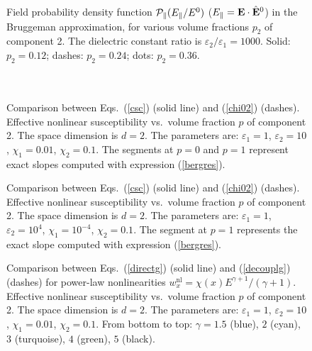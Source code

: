 \begin{figure}
\narrowtext
\vspace*{0.0cm}
\centerline{
}
\vspace*{0.0cm}
\caption{Field probability density function 
${\cal P}_\parallel(E_\parallel/E^0)$ 
($E_\parallel={\bf E}\cdot\hat{\bf E}^0$) in 
the Bruggeman approximation, for various volume 
fractions $p_2$ of component 2. The dielectric 
constant ratio is $\varepsilon_2/\varepsilon_1=1000$. 
Solid: $p_2=0.12$; dashes: $p_2=0.24$; dots: $p_2=0.36$.\\
\\
\\
}
\label{fig3}
\end{figure}

\begin{figure}
\narrowtext
\vspace*{0.0cm}
\centerline{
}
\vspace*{0.3cm}
\caption{Comparison between Eqs.\ (\ref{csc}) 
(solid line) and (\ref{chi02}) (dashes). Effective 
nonlinear susceptibility vs.\ volume fraction $p$ of 
component 2. The space dimension is $d=2$. The 
parameters are: $\varepsilon_1=1$, $\varepsilon_2=10$, 
$\chi_1=0.01$, $\chi_2=0.1$. The segments at $p=0$ and 
$p=1$ represent exact slopes computed with expression 
(\ref{bergres}).}
\label{fig4}
\end{figure}

\begin{figure}
\narrowtext
\vspace*{0.0cm}
\centerline{
}
\vspace*{0.0cm}
\caption{Comparison between Eqs.\ (\ref{csc}) 
(solid line) and (\ref{chi02}) (dashes). Effective 
nonlinear susceptibility vs.\ volume fraction $p$ of 
component 2. The space dimension is $d=2$. The parameters 
are: $\varepsilon_1=1$, $\varepsilon_2=10^4$, $\chi_1=10^{-4}$, 
$\chi_2=0.1$. The segment at $p=1$ represents the exact slope 
computed with expression (\ref{bergres}).
}
\label{fig5}
\end{figure}

\begin{figure}
\narrowtext
\vspace*{0.0cm}
\centerline{
}
\vspace*{0.3cm}
\caption{Comparison between Eqs.\ (\ref{directg}) 
(solid line) and (\ref{decouplg}) (dashes) for power-law 
nonlinearities $w^{\text{nl}}_x=\chi(x) E^{\gamma+1}/(\gamma+1)$. 
Effective nonlinear susceptibility vs.\ volume fraction $p$ of 
component 2. The space dimension is $d=2$. The parameters are: 
$\varepsilon_1=1$, $\varepsilon_2=10$, $\chi_1=0.01$, 
$\chi_2=0.1$. From bottom to top: $\gamma=1.5$ (blue), $2$ (cyan), 
$3$ (turquoise), $4$ (green), $5$ (black).
}
\label{fig6}
\end{figure}








